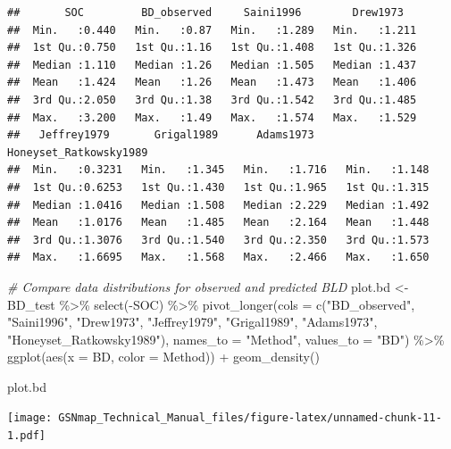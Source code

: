 \documentclass[
  10pt,
  b5paper,
  oneside]{book}
\newenvironment{Shaded}{\begin{snugshade}}{\end{snugshade}}
\newcommand{\AttributeTok}[1]{\textcolor[rgb]{0.77,0.63,0.00}{#1}}
\newcommand{\CommentTok}[1]{\textcolor[rgb]{0.56,0.35,0.01}{\textit{#1}}}
\newcommand{\FunctionTok}[1]{\textcolor[rgb]{0.00,0.00,0.00}{#1}}
\newcommand{\NormalTok}[1]{#1}
\newcommand{\OtherTok}[1]{\textcolor[rgb]{0.56,0.35,0.01}{#1}}
\newcommand{\SpecialCharTok}[1]{\textcolor[rgb]{0.00,0.00,0.00}{#1}}
\newcommand{\StringTok}[1]{\textcolor[rgb]{0.31,0.60,0.02}{#1}}
\begin{document}
\begin{verbatim}
##       SOC         BD_observed     Saini1996        Drew1973    
##  Min.   :0.440   Min.   :0.87   Min.   :1.289   Min.   :1.211  
##  1st Qu.:0.750   1st Qu.:1.16   1st Qu.:1.408   1st Qu.:1.326  
##  Median :1.110   Median :1.26   Median :1.505   Median :1.437  
##  Mean   :1.424   Mean   :1.26   Mean   :1.473   Mean   :1.406  
##  3rd Qu.:2.050   3rd Qu.:1.38   3rd Qu.:1.542   3rd Qu.:1.485  
##  Max.   :3.200   Max.   :1.49   Max.   :1.574   Max.   :1.529  
##   Jeffrey1979       Grigal1989      Adams1973     Honeyset_Ratkowsky1989
##  Min.   :0.3231   Min.   :1.345   Min.   :1.716   Min.   :1.148         
##  1st Qu.:0.6253   1st Qu.:1.430   1st Qu.:1.965   1st Qu.:1.315         
##  Median :1.0416   Median :1.508   Median :2.229   Median :1.492         
##  Mean   :1.0176   Mean   :1.485   Mean   :2.164   Mean   :1.448         
##  3rd Qu.:1.3076   3rd Qu.:1.540   3rd Qu.:2.350   3rd Qu.:1.573         
##  Max.   :1.6695   Max.   :1.568   Max.   :2.466   Max.   :1.650
\end{verbatim}

\begin{Shaded}
\begin{Highlighting}[]
\CommentTok{\# Compare data distributions for observed and predicted BLD}
\NormalTok{plot.bd }\OtherTok{\textless{}{-}}\NormalTok{ BD\_test }\SpecialCharTok{\%\textgreater{}\%}
  \FunctionTok{select}\NormalTok{(}\SpecialCharTok{{-}}\NormalTok{SOC) }\SpecialCharTok{\%\textgreater{}\%} 
  \FunctionTok{pivot\_longer}\NormalTok{(}\AttributeTok{cols =} \FunctionTok{c}\NormalTok{(}\StringTok{"BD\_observed"}\NormalTok{, }\StringTok{"Saini1996"}\NormalTok{, }\StringTok{"Drew1973"}\NormalTok{,}
                        \StringTok{"Jeffrey1979"}\NormalTok{,}
                        \StringTok{"Grigal1989"}\NormalTok{, }\StringTok{"Adams1973"}\NormalTok{, }
                        \StringTok{"Honeyset\_Ratkowsky1989"}\NormalTok{), }
               \AttributeTok{names\_to =} \StringTok{"Method"}\NormalTok{, }\AttributeTok{values\_to =} \StringTok{"BD"}\NormalTok{) }\SpecialCharTok{\%\textgreater{}\%} 
  \FunctionTok{ggplot}\NormalTok{(}\FunctionTok{aes}\NormalTok{(}\AttributeTok{x =}\NormalTok{ BD, }\AttributeTok{color =}\NormalTok{ Method)) }\SpecialCharTok{+} 
  \FunctionTok{geom\_density}\NormalTok{()}

\NormalTok{plot.bd}
\end{Highlighting}
\end{Shaded}

\texttt{[image: GSNmap\_Technical\_Manual\_files/figure-latex/unnamed-chunk-11-1.pdf]}
\end{document}
